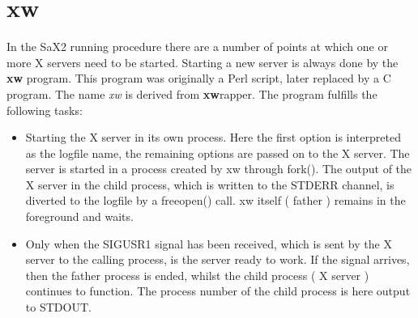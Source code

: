 \section{xw}
\label{sec:xw}
In the SaX2 running procedure there are a number of points at which one or
more X servers need to be started. Starting a new server is always done by the
\textbf{xw} program.
This program was originally a Perl script, later replaced by a C program. The
name \textit{xw} is derived from \textbf{xw}rapper. The program fulfills the
following tasks:
\begin{itemize}
\item Starting the X server in its own process. Here the first option is
  interpreted as the logfile name, the remaining options are passed on to the
  X server. The server is started in a process created by xw through
  fork(). The output of the X server in the child process, which is written
  to the STDERR channel, is diverted to the logfile by a freeopen() call.
      xw itself ( father ) remains in the foreground and waits. 
\item Only when the SIGUSR1 signal has been received, which is sent by the X
  server to the calling process, is the server ready to work. If the signal
  arrives, then the father process is ended, whilst the child process ( X
  server ) continues to function. The process number of the child process is
  here output to STDOUT.
\end{itemize}

